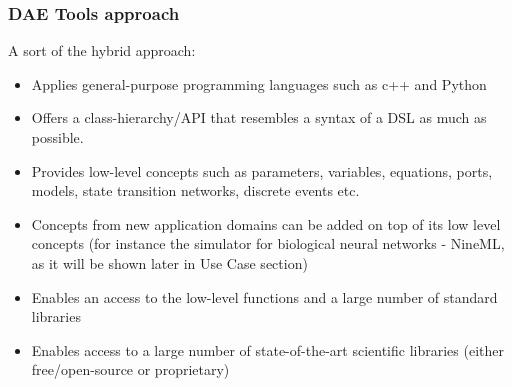\documentclass[compress,newPxFont,sthlmFooter]{beamer}
\begin{document}
\begin{frame}
\frametitle{DAE Tools approach}
\begin{block}{}
A sort of the hybrid approach:
\begin{itemize}
  \item Applies general-purpose programming languages such as c++ and Python
  \item Offers a class-hierarchy/API that resembles a syntax of a DSL as much as possible. 
  \item Provides low-level concepts such as parameters, variables, equations, ports, models, state transition networks, discrete events etc.
  \item Concepts from new application domains can be added on top of its low level concepts (for instance the simulator for biological neural networks - NineML, as it will be shown later in Use Case section)
  \item Enables an access to the low-level functions and a large number of standard libraries
  \item Enables access to a large number of state-of-the-art scientific libraries (either free/open-source or proprietary)
\end{itemize}
\end{block}
\end{frame}
\end{document}
